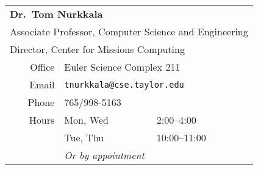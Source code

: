 \begin{center}
  \begin{tabular}{rll}
    \toprule
    \multicolumn{3}{l}{\textbf{Dr.\ Tom Nurkkala}}                            \\
    \multicolumn{3}{l}{Associate Professor, Computer Science and Engineering} \\
    \multicolumn{3}{l}{Director, Center for Missions Computing}               \\
    \midrule
    Office & \multicolumn{2}{l}{Euler Science Complex 211}                    \\
    Email  & \multicolumn{2}{l}{\texttt{tnurkkala@cse.taylor.edu}}            \\
    Phone  & \multicolumn{2}{l}{765/998-5163}                                 \\
    Hours  & Mon, Wed & 2:00--4:00                                            \\
           & Tue, Thu & 10:00--11:00                                          \\
           & \multicolumn{2}{l}{\emph{Or by appointment}}                     \\
    \bottomrule
  \end{tabular}
\end{center}


